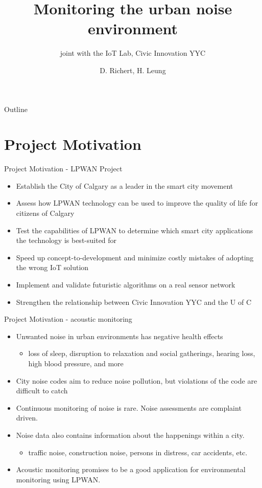 \documentclass{beamer}
\title{Monitoring the urban noise environment}
\subtitle{joint with the IoT Lab, Civic Innovation YYC}
\author{D. Richert, H. Leung}
\institute[University of Calgary]
{
  Department of Electrical and Computer Engineering\\
  Schulich School of Engineering\\University of Calgary
}
\date{\scalebox{1}{\insertlogo}}
\begin{document}
\begin{frame}
  \titlepage
\end{frame}

\begin{frame}{Outline}
  \tableofcontents
\end{frame}

\section{Project Motivation}

    \begin{frame}{Project Motivation - LPWAN Project}
        \begin{itemize}
            \item Establish the City of Calgary as a leader in the smart city movement
            \item Assess how LPWAN technology can be used to improve the quality of life for citizens of Calgary
            \item Test the capabilities of LPWAN to determine which smart city applications the technology is best-suited for
            \item Speed up concept-to-development and minimize costly mistakes of adopting the wrong IoT solution
            \item Implement and validate futuristic algorithms on a real sensor network
            \item Strengthen the  relationship between Civic Innovation YYC and the U of C 
        \end{itemize}
    \end{frame}

    \begin{frame}{Project Motivation - acoustic monitoring}
        \begin{itemize}
            \item Unwanted noise in urban environments has negative health effects
            \begin{itemize}
                \item loss of sleep, disruption to relaxation and social gatherings, hearing loss, high blood pressure, and more
            \end{itemize}
            \item City noise codes aim to reduce noise pollution, but violations of the code are difficult to catch
            \item Continuous monitoring of noise is rare. Noise assessments are complaint driven.
            \item Noise data also contains information about the happenings within a city.
                \begin{itemize}
                    \item traffic noise, construction noise, persons in distress, car accidents, etc.
                \end{itemize}
            \item Acoustic monitoring promises to be a good application for environmental monitoring using LPWAN.
        \end{itemize}
    \end{frame}
\end{document}
